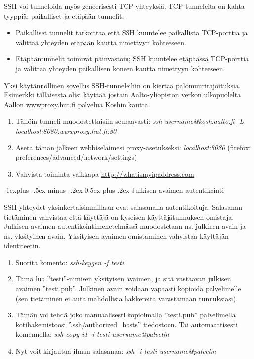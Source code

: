 \documentclass[12pt,portrait,a4]{article}
\makeatletter
\renewcommand{\subsection}{\@startsection{subsection}{2}{0mm}%
                                {-1explus -.5ex minus -.2ex}%
                                {0.5ex plus .2ex}%
                                {\normalfont\normalsize\bfseries}}
\makeatother
\begin{document}
SSH voi tunneloida myös geneerisesti TCP-yhteyksiä.
TCP-tunneleita on kahta tyyppiä: paikalliset ja etäpään tunnelit.

\begin{itemize}
\item Paikalliset tunnelit tarkoittaa että SSH kuuntelee paikallista TCP-porttia
ja välittää yhteyden etäpään kautta nimettyyn kohteeseen.
\item Etäpääntunnelit toimivat päinvastoin; SSH kuuntelee etäpäässä TCP-porttia
ja välittää yhteyden paikallisen koneen kautta nimettyyn kohteeseen.
\end{itemize}

Yksi käytännöllinen sovellus SSH-tunneleihin on kiertää palomuurirajoituksia.
Esimerkki tällaisesta olisi käyttää jostain Aalto-yliopiston verkon
ulkopuolelta Aallon wwwproxy.hut.fi palvelua Koshin kautta.

\begin{enumerate}
\item Tällöin tunneli muodostettaisiin seuraavasti:
\emph{ssh username@kosh.aalto.fi -L localhost:8080:wwwproxy.hut.fi:80}
\item Aseta tämän jälkeen webbiselaimesi proxy-asetukseksi: \emph{localhost:8080}
(firefox: preferences/advanced/network/settings)
\item Vahvista toiminta vaikkapa \url{http://whatismyipaddress.com}
\end{enumerate}

\subsection{Julkisen avaimen autentikointi}

SSH-yhteydet yksinkertaisimmillaan ovat salasanalla autentikoituja.
Salasanan tietäminen vahvistaa että käyttäjä on kyseisen käyttäjätunnuksen
omistaja.  Julkisen avaimen autentikointimenetelmässä muodostetaan ns.
julkinen avain ja ns. yksityinen avain.  Yksityisen avaimen omistaminen
vahvistaa käyttäjän identiteetin.

\begin{enumerate}
\item Suorita komento: \emph{ssh-keygen -f testi}
\item Tämä luo ''testi''-nimisen yksityisen avaimen, ja sitä vastaavan julkisen
avaimen ''testi.pub''.  Julkinen avain voidaan vapaasti kopioida palvelimelle
(sen tietäminen ei auta mahdollisia hakkereita varastamaan tunnuksiasi).
\item Tämän voi tehdä joko manuaalisesti kopioimalla ''testi.pub'' palvelimella
kotihakemistoosi ''.ssh/authorized\_hosts'' tiedostoon.  Tai automaattisesti
komennolla: \emph{ssh-copy-id -i testi username@palvelin}
\item Nyt voit kirjautua ilman salasanaa: \emph{ssh -i testi username@palvelin}
\end{enumerate}
\end{document}
